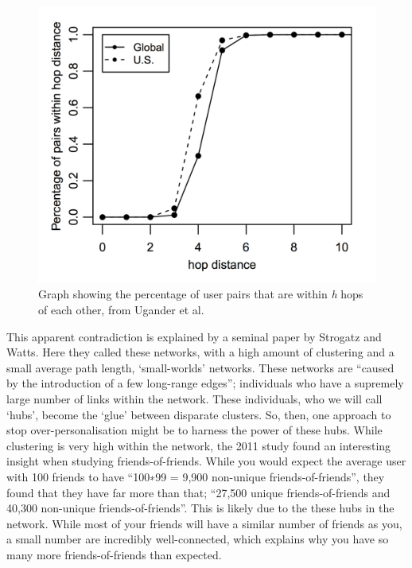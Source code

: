 \documentclass[]{article}
\begin{document}
\begin{figure}
\centering
\includegraphics{FBLinks.png}
\caption{Graph showing the percentage of user pairs that are within
\emph{h} hops of each other, from Ugander et
al.\autocite[pg 4, fig 2]{UganderAnatomyFacebookSocial2011}}
\end{figure}

This apparent contradiction is explained by a seminal paper by Strogatz
and Watts\autocite{WattsCollectivedynamicssmallworld1998}. Here they
called these networks, with a high amount of clustering and a small
average path length, `small-worlds'
networks\autocite[pg 440]{WattsCollectivedynamicssmallworld1998}. These
networks are ``caused by the introduction of a few long-range
edges''\autocite[pg 4]{WattsCollectivedynamicssmallworld1998};
individuals who have a supremely large number of links within the
network. These individuals, who we will call `hubs', become the `glue'
between disparate clusters. So, then, one approach to stop
over-personalisation might be to harness the power of these hubs. While
clustering is very high within the network, the 2011 study found an
interesting insight when studying friends-of-friends. While you would
expect the average user with 100 friends to have ``100∗99 = 9,900
non-unique
friends-of-friends''\autocite[pg 8]{UganderAnatomyFacebookSocial2011},
they found that they have far more than that; ``27,500 unique
friends-of-friends and 40,300 non-unique
friends-of-friends''\autocite[pg 8]{UganderAnatomyFacebookSocial2011}.
This is likely due to the these hubs in the network. While most of your
friends will have a similar number of friends as you, a small number are
incredibly well-connected, which explains why you have so many more
friends-of-friends than expected.
\end{document}
